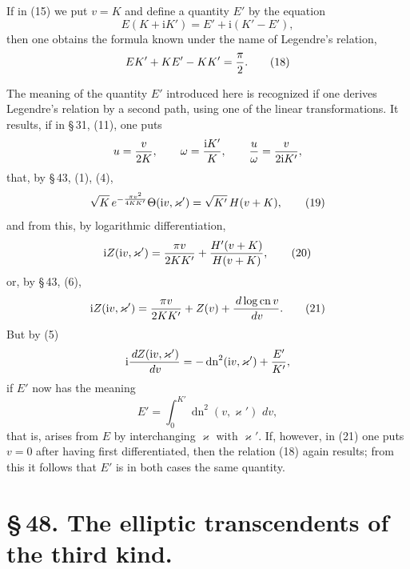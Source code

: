 \documentclass[11pt]{article}
\providecommand{\dd}{\,d}
\providecommand{\cn}{\operatorname{cn}}
\providecommand{\dn}{\operatorname{dn}}
\providecommand{\ii}{\mathrm{i}}
\begin{document}
If in (15) we put $v=K$ and define a quantity $E'$ by the equation
\begin{equation}
E(K+\ii K')=E'+\ii(K'-E'),
\tag{17}
\end{equation}
then one obtains the formula known under the name of Legendre's relation,
\begin{equation}
EK'+KE'-KK'={\pi\over2}.
\tag{18}
\end{equation}

The meaning of the quantity $E'$ introduced here is recognized if one derives Legendre's relation by a second path, using one of the linear transformations. It results, if in \S\,31, (11), one puts
\[
u={v\over2K},
\qquad
\omega={\ii K'\over K},
\qquad
{u\over\omega}={v\over2\ii K'},
\]
that, by \S\,43, (1), (4),
\begin{equation}
\sqrt{K}\,e^{-{\pi v^2\over4KK'}}\Theta(\ii v,\varkappa')=\sqrt{K'}\,H(v+K),
\tag{19}
\end{equation}
and from this, by logarithmic differentiation,
\begin{equation}
\ii Z(\ii v,\varkappa')={\pi v\over2KK'}+{H'(v+K)\over H(v+K)},
\tag{20}
\end{equation}
or, by \S\,43, (6),
\begin{equation}
\ii Z(\ii v,\varkappa')={\pi v\over2KK'}+Z(v)+{\dd\log\cn v\over\dd v}.
\tag{21}
\end{equation}
But by (5)
\[
\ii{\dd Z(\ii v,\varkappa')\over\dd v}=-\dn^2(\ii v,\varkappa')+{E'\over K'},
\]
if $E'$ now has the meaning
\begin{equation}
E'=\int_0^{K'}\dn^2(v,\varkappa')\,\dd v,
\tag{22}
\end{equation}
that is, arises from $E$ by interchanging $\varkappa$ with $\varkappa'$. If, however, in (21) one puts $v=0$ after having first differentiated, then the relation (18) again results; from this it follows that $E'$ is in both cases the same quantity.

\section*{\S\,48. The elliptic transcendents of the third kind.}
\end{document}
